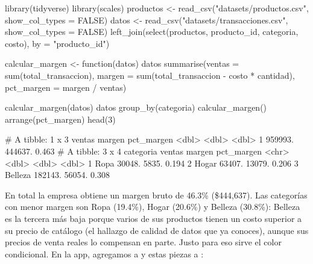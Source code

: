 \begin{rcode}
library(tidyverse)
library(scales)
productos <- read_csv("datasets/productos.csv", show_col_types = FALSE)
datos <- read_csv("datasets/transacciones.csv", show_col_types = FALSE) %
  left_join(select(productos, producto_id, categoria, costo),
            by = "producto_id")

calcular_margen <- function(datos) {
  datos %
    summarise(ventas = sum(total_transaccion),
              margen = sum(total_transaccion - costo * cantidad),
              pct_margen = margen / ventas)
}

calcular_margen(datos)
datos %
  group_by(categoria) %
  calcular_margen() %
  arrange(pct_margen) %
  head(3)
\end{rcode}
\begin{rsalida}
# A tibble: 1 x 3
   ventas  margen pct_margen
    <dbl>   <dbl>      <dbl>
1 959993. 444637.      0.463
# A tibble: 3 x 4
  categoria  ventas margen pct_margen
  <chr>       <dbl>  <dbl>      <dbl>
1 Ropa       30048.  5835.      0.194
2 Hogar      63407. 13079.      0.206
3 Belleza   182143. 56054.      0.308
\end{rsalida}

En total la empresa obtiene un margen bruto de 46.3\% (\$444,637). Las
categorías con menor margen son Ropa (19.4\%), Hogar (20.6\%) y Belleza
(30.8\%): Belleza es la tercera más baja porque varios de sus productos tienen
un costo superior a su precio de catálogo (el hallazgo de calidad de datos
que ya conoces), aunque sus precios de venta reales lo compensan en parte. Justo para eso sirve el color condicional. En la
app, agregamos  a
 y estas piezas a :


